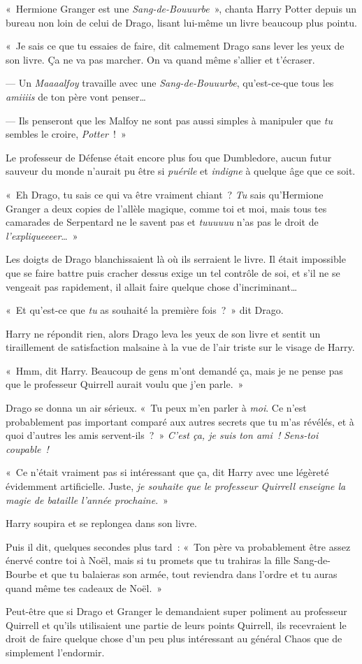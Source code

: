 «~Hermione Granger est une \emph{Sang-de-Bouuurbe}~», chanta Harry Potter depuis un bureau non loin de celui de Drago, lisant lui-même un livre beaucoup plus pointu.

«~Je sais ce que tu essaies de faire, dit calmement Drago sans lever les yeux de son livre.
Ça ne va pas marcher.
On va quand même s'allier et t'écraser.

--- Un \emph{Maaaalfoy} travaille avec une \emph{Sang-de-Bouuurbe}, qu'est-ce-que tous les \emph{amiiiis} de ton père vont penser…

--- Ils penseront que les Malfoy ne sont pas aussi simples à manipuler que \emph{tu} sembles le croire, \emph{Potter}~!~»

Le professeur de Défense était encore plus fou que Dumbledore, aucun futur sauveur du monde n'aurait pu être si \emph{puérile} et \emph{indigne} à quelque âge que ce soit.

«~Eh Drago, tu sais ce qui va être vraiment chiant~?
\emph{Tu} sais qu'Hermione Granger a deux copies de l'allèle magique, comme toi et moi, mais tous tes camarades de Serpentard ne le savent pas et \emph{tuuuuuu} n'as pas le droit de \emph{l'expliqueeeer}…~»

Les doigts de Drago blanchissaient là où ils serraient le livre.
Il était impossible que se faire battre puis cracher dessus exige un tel contrôle de soi, et s'il ne se vengeait pas rapidement, il allait faire quelque chose d'incriminant…

«~Et qu'est-ce que \emph{tu} as souhaité la première fois~?~»
dit Drago.

Harry ne répondit rien, alors Drago leva les yeux de son livre et sentit un tiraillement de satisfaction malsaine à la vue de l'air triste sur le visage de Harry.

«~Hmm, dit Harry.
Beaucoup de gens m'ont demandé ça, mais je ne pense pas que le professeur Quirrell aurait voulu que j'en parle.~»

Drago se donna un air sérieux.
«~Tu peux m'en parler à \emph{moi}.
Ce n'est probablement pas important comparé aux autres secrets que tu m'as révélés, et à quoi d'autres les amis servent-ils~?~»
\emph{C'est ça, je suis ton ami~!
Sens-toi coupable~!}

«~Ce n'était vraiment pas si intéressant que ça, dit Harry avec une légèreté évidemment artificielle.
Juste, \emph{je souhaite que le professeur Quirrell enseigne la magie de bataille l'année prochaine}.~»

Harry soupira et se replongea dans son livre.

Puis il dit, quelques secondes plus tard~: «~Ton père va probablement être assez énervé contre toi à Noël, mais si tu promets que tu trahiras la fille Sang-de-Bourbe et que tu balaieras son armée, tout reviendra dans l'ordre et tu auras quand même tes cadeaux de Noël.~»

Peut-être que si Drago et Granger le demandaient super poliment au professeur Quirrell et qu'ils utilisaient une partie de leurs points Quirrell, ils recevraient le droit de faire quelque chose d'un peu plus intéressant au général Chaos que de simplement l'endormir.~
